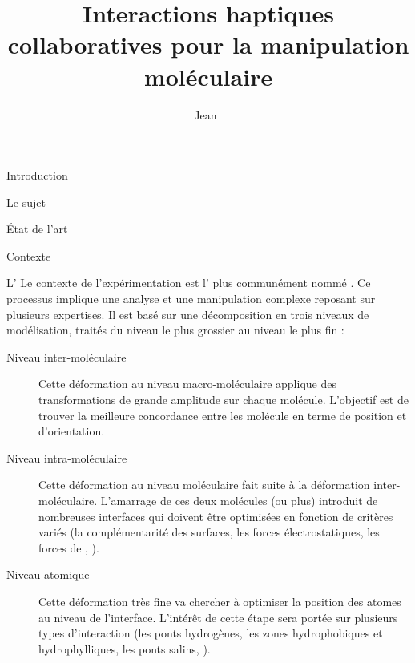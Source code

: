 \documentclass[myfrancais]{mythesis}
\title{Interactions haptiques collaboratives pour la manipulation moléculaire}
\author{Jean~\myname{Simard}}
\date{\mydate[datestyle=long]{01/12/2011}}
\begin{document}
	\frontmatter
	\maketitle
	\mytoc
	\mylof
	\mylot
	\mylotodo
	\mainmatter
	\begin{mypart}{Introduction}
		\begin{mychapter}{Le sujet}
			\begin{mysection}{État de l'art}
			\end{mysection}
			\begin{mysection}{Contexte}
				\begin{mysubsection}{L'}
					Le contexte de l'expérimentation est l' plus communément nommé .
					Ce processus implique une analyse et une manipulation complexe reposant sur plusieurs expertises.
					Il est basé sur une décomposition en trois niveaux de modélisation, traités du niveau le plus grossier au niveau le plus fin :
					\begin{description}
						\item[Niveau inter-moléculaire] Cette déformation au niveau macro-moléculaire applique des transformations de grande amplitude sur chaque molécule.
							L'objectif est de trouver la meilleure concordance entre les molécule en terme de position et d'orientation.
						\item[Niveau intra-moléculaire] Cette déformation au niveau moléculaire fait suite à la déformation inter-moléculaire.
							L'amarrage de ces deux molécules (ou plus) introduit de nombreuses interfaces qui doivent être optimisées en fonction de critères variés (la complémentarité des surfaces, les forces électrostatiques, les forces de  , \myetc).
						\item[Niveau atomique] Cette déformation très fine va chercher à optimiser la position des atomes au niveau de l'interface.
							L'intérêt de cette étape sera portée sur plusieurs types d'interaction (les ponts hydrogènes, les zones hydrophobiques et hydrophylliques, les ponts salins, \myetc).
					\end{description}


\end{mysubsection}
\end{mysection}
\end{mychapter}
\end{mypart}
\end{document}
